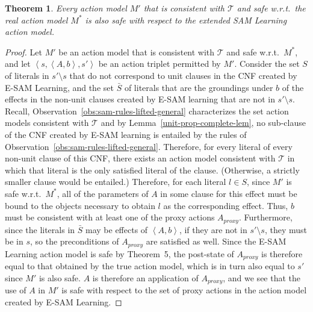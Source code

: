 \documentclass{article}
\newtheorem{theorem}{Theorem}
\newcommand{\tuple}[1]{\ensuremath{\left \langle #1 \right \rangle }}
\newcommand{\realm}{\ensuremath{M^*}\xspace}
\newcommand{\lifta}{A}
\begin{document}
\begin{theorem}\label{e-sam-strong-theorem}
Every action model $M'$ that is consistent with $\mathcal{T}$ 
and safe w.r.t.\ the real action model \realm is also safe with respect to the extended SAM Learning action model.
\end{theorem}
\begin{proof}
Let $M'$ be an action model that is consistent with $\mathcal{T}$ and safe w.r.t.\ \realm, and let $\tuple{s,\tuple{\lifta,b},s'}$ be an action triplet permitted by $M'$. 
Consider the set $S$ of literals in $s'\setminus s$ that do not correspond to unit clauses in the CNF created by E-SAM Learning, and the set $\bar{S}$ of literals that are the groundings under $b$ of the effects in the non-unit clauses created by E-SAM learning that are not in $s'\setminus s$. %
Recall, Observation~\ref{obs:sam-rules-lifted-general} characterizes the set action models consistent with $\mathcal{T}$ and by Lemma~\ref{unit-prop-complete-lem}, no sub-clause of the CNF created by E-SAM learning is entailed by the rules of Observation~\ref{obs:sam-rules-lifted-general}. 
Therefore, for every literal of every non-unit clause of this CNF, there exists an action model consistent with $\mathcal{T}$ in which that literal is the only satisfied literal of the clause. (Otherwise, a strictly smaller clause would be entailed.) Therefore, for each literal $l\in S$, since $M'$ is safe w.r.t.\ \realm, all of the parameters of $\lifta$ in some clause for this effect must be bound to the objects necessary to obtain $l$ as the corresponding effect. Thus, $b$ must be consistent with at least one of the proxy actions $\lifta_{proxy}$. Furthermore, since the literals in $\bar{S}$ may be effects of $\tuple{\lifta, b}$, if they are not in $s'\setminus s$, they must be in $s$, so the preconditions of $\lifta_{proxy}$ are satisfied as well. Since the E-SAM Learning action model is safe by Theorem~5, the post-state of $\lifta_{proxy}$ is therefore equal to that obtained by the true action model, which is in turn also equal to $s'$ since $M'$ is also safe. $\lifta$ is therefore an application of $\lifta_{proxy}$, and we see that the use of $\lifta$ in $M'$ is safe with respect to the set of proxy actions in the action model created by E-SAM Learning.
\end{proof}
\end{document}
